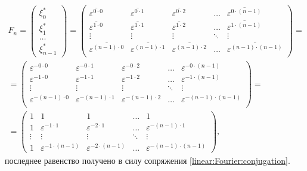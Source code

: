 \begin{multline*}
    F_n =
    \begin{pmatrix}
        \xi_0^* \\
        \xi_1^* \\
        \dots   \\
        \xi_{n-1}^*
    \end{pmatrix}
    =
    \begin{pmatrix}
        \overline{\varepsilon^{0 \cdot 0}}     & \overline{\varepsilon^{0 \cdot 1}}     & \overline{\varepsilon^{0 \cdot 2}}     & \dots  & \overline{\varepsilon^{0 \cdot (n-1)}}     \\
        \overline{\varepsilon^{1 \cdot 0}}     & \overline{\varepsilon^{1 \cdot 1}}     & \overline{\varepsilon^{1 \cdot 2}}     & \dots  & \overline{\varepsilon^{1 \cdot (n-1)}}     \\
        \vdots                                 & \vdots                                 & \vdots                                 & \ddots & \vdots                                     \\
        \overline{\varepsilon^{(n-1) \cdot 0}} & \overline{\varepsilon^{(n-1) \cdot 1}} & \overline{\varepsilon^{(n-1) \cdot 2}} & \dots  & \overline{\varepsilon^{(n-1) \cdot (n-1)}} \\
    \end{pmatrix} = \\
    = \begin{pmatrix}
        \varepsilon^{- 0 \cdot 0}     & \varepsilon^{- 0 \cdot 1}     & \varepsilon^{- 0 \cdot 2}     & \dots  & \varepsilon^{- 0 \cdot (n-1)}     \\
        \varepsilon^{- 1 \cdot 0}     & \varepsilon^{- 1 \cdot 1}     & \varepsilon^{- 1 \cdot 2}     & \dots  & \varepsilon^{- 1 \cdot (n-1)}     \\
        \vdots                        & \vdots                        & \vdots                        & \ddots & \vdots                            \\
        \varepsilon^{- (n-1) \cdot 0} & \varepsilon^{- (n-1) \cdot 1} & \varepsilon^{- (n-1) \cdot 2} & \dots  & \varepsilon^{- (n-1) \cdot (n-1)} \\
    \end{pmatrix} = \\
    = \begin{pmatrix}
        1      & 1                             & 1                             & \dots  & 1                                 \\
        1      & \varepsilon^{- 1 \cdot 1}     & \varepsilon^{- 2 \cdot 1}     & \dots  & \varepsilon^{- (n-1) \cdot 1}     \\
        \vdots & \vdots                        & \vdots                        & \ddots & \vdots                            \\
        1      & \varepsilon^{- 1 \cdot (n-1)} & \varepsilon^{- 2 \cdot (n-1)} & \dots  & \varepsilon^{- (n-1) \cdot (n-1)}
    \end{pmatrix}
    ,
\end{multline*}
последнее равенство получено в силу сопряжения \eqref{linear:Fourier:conjugation}.

